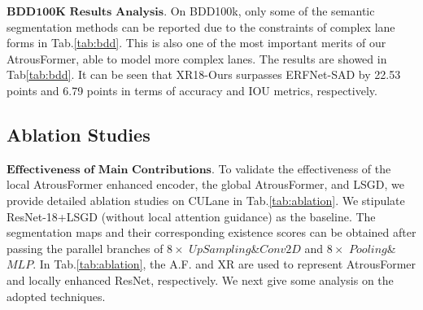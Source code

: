 \documentclass[preprint,12pt,review]{elsarticle}
\begin{document}
$\textbf{BDD100K Results Analysis.}$ On BDD100k, only some of the semantic segmentation methods can be reported due to the constraints of complex lane forms in Tab.\ref{tab:bdd}.  This is also one of the most important merits of our AtrousFormer, able to model more complex lanes. The results are showed in Tab\ref{tab:bdd}. It can be seen that XR18-Ours surpasses ERFNet-SAD by 22.53 points and 6.79 points in terms of accuracy and IOU metrics, respectively.




\subsection{Ablation Studies}
$\textbf{Effectiveness of Main Contributions.}$ To validate the effectiveness of the local AtrousFormer enhanced encoder, the global AtrousFormer, and LSGD, we provide detailed ablation studies on CULane in Tab.\ref{tab:ablation}. We stipulate ResNet-18+LSGD (without local attention guidance) as the baseline. The segmentation maps and their corresponding existence scores can be obtained after passing the parallel branches of $8\times$ $UpSampling$\&$Conv2D$ and $8\times$ $Pooling$\&$MLP$. In Tab.\ref{tab:ablation}, the A.F. and XR are used to represent AtrousFormer and locally enhanced ResNet, respectively. We next give some analysis on the adopted techniques.

\begin{table}
	\centering
	\caption{Ablation studies on the test set of CULane against $\rm F1$, Precision, and Recall metrics.}
	\label{tab:ablation}
\end{table}
\end{document}
